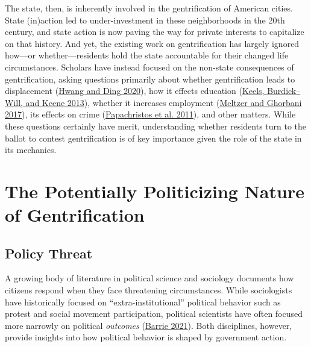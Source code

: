 \documentclass[
  12pt,
]{article}
\begin{document}
The state, then, is inherently involved in the gentrification of American cities. State (in)action led to under-investment in these neighborhoods in the 20th century, and state action is now paving the way for private interests to capitalize on that history. And yet, the existing work on gentrification has largely ignored how---or whether---residents hold the state accountable for their changed life circumstances. Scholars have instead focused on the non-state consequences of gentrification, asking questions primarily about whether gentrification leads to displacement (\protect\hyperlink{ref-Hwang2020}{Hwang and Ding 2020}), how it effects education (\protect\hyperlink{ref-Keels2013}{Keels, Burdick--Will, and Keene 2013}), whether it increases employment (\protect\hyperlink{ref-Meltzer2017}{Meltzer and Ghorbani 2017}), its effects on crime (\protect\hyperlink{ref-Papachristos2011}{Papachristos et al. 2011}), and other matters. While these questions certainly have merit, understanding whether residents turn to the ballot to contest gentrification is of key importance given the role of the state in its mechanics.

\hypertarget{the-potentially-politicizing-nature-of-gentrification}{%
\section*{The Potentially Politicizing Nature of Gentrification}\label{the-potentially-politicizing-nature-of-gentrification}}

\hypertarget{policy-threat}{%
\subsection*{Policy Threat}\label{policy-threat}}

A growing body of literature in political science and sociology documents how citizens respond when they face threatening circumstances. While sociologists have historically focused on ``extra-institutional'' political behavior such as protest and social movement participation, political scientists have often focused more narrowly on political \emph{outcomes} (\protect\hyperlink{ref-Barrie2021}{Barrie 2021}). Both disciplines, however, provide insights into how political behavior is shaped by government action.
\end{document}
